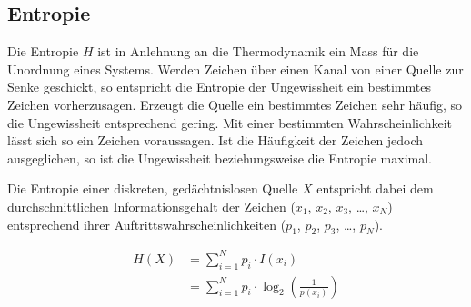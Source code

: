 \subsection{Entropie}

Die Entropie $H$ ist in Anlehnung an die Thermodynamik ein Mass für die
Unordnung eines Systems. Werden Zeichen über einen Kanal von einer Quelle zur
Senke geschickt, so entspricht die Entropie der Ungewissheit ein bestimmtes
Zeichen vorherzusagen. Erzeugt die Quelle ein bestimmtes Zeichen sehr häufig, so
die Ungewissheit entsprechend gering. Mit einer bestimmten Wahrscheinlichkeit
lässt sich so ein Zeichen voraussagen. Ist die Häufigkeit der Zeichen jedoch
ausgeglichen, so ist die Ungewissheit beziehungsweise die Entropie maximal. 

Die Entropie einer diskreten, gedächtnislosen Quelle $X$ entspricht dabei dem
durchschnittlichen Informationsgehalt der Zeichen ($x_1$, $x_2$, $x_3$, \ldots,
$x_N$) entsprechend ihrer Auftrittswahrscheinlichkeiten ($p_1$, $p_2$, $p_3$,
\ldots, $p_N$). 

\begin{align*}
H(X)& =\sum\limits_{i=1}^N p_i \cdot I(x_i) \\
& =\sum\limits_{i=1}^N p_i \cdot \log_2\left(\frac{1}{p(x_i)}\right)
\end{align*}
